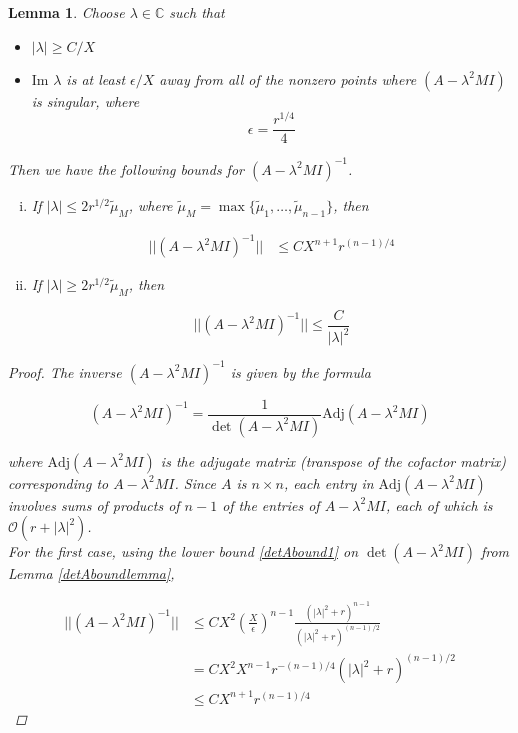 \documentclass[12pt]{article}
\def\C{{\mathbb C}}
\newtheorem{lemma}{Lemma}
\begin{document}
\begin{lemma}\label{Ainvboundlemma}
Choose $\lambda \in \C$ such that
\begin{itemize}
	\item $|\lambda| \geq C/X$
	\item $\text{Im }\lambda$ is at least $\epsilon/X$ away from all of the nonzero points where $(A - \lambda^2 MI)$ is singular, where
	\[
	\epsilon = \frac{r^{1/4}}{4}
	\]
\end{itemize}

Then we have the following bounds for $(A - \lambda^2 M I)^{-1}$.
\begin{enumerate}[(i)]
\item If $|\lambda| \leq 2 r^{1/2} \tilde{\mu}_M$, where $\tilde{\mu}_M = \max\{\tilde{\mu}_1, \dots, \tilde{\mu}_{n-1}\}$, then

\begin{align}\label{Ainvbound1}
||(A - \lambda^2 M I)^{-1}|| &\leq C X ^{n+1} r^{(n-1)/4}
\end{align}

\item If $|\lambda| \geq 2 r^{1/2} \tilde{\mu}_M$, then

\begin{equation}\label{Ainvbound2}
||(A - \lambda^2 M I)^{-1}|| \leq \frac{C}{|\lambda|^2}
\end{equation}

\end{enumerate}
\begin{proof}
The inverse $(A - \lambda^2 M I)^{-1}$ is given by the formula

\[
(A - \lambda^2 M I)^{-1} = \frac{1}{\det(A - \lambda^2 M I)}\text{Adj}(A - \lambda^2 M I)
\]

where $\text{Adj}(A - \lambda^2 M I)$ is the adjugate matrix (transpose of the cofactor matrix) corresponding to $A - \lambda^2 M I$. Since $A$ is $n \times n$, each entry in $\text{Adj}(A - \lambda^2 M I)$ involves sums of products of $n-1$ of the entries of $A - \lambda^2 M I$, each of which is $\mathcal{O}(r + |\lambda|^2)$. \\

For the first case, using the lower bound \eqref{detAbound1} on $\det(A - \lambda^2 M I)$ from Lemma \ref{detAboundlemma}, 

\begin{align*}
||(A - \lambda^2 M I)^{-1}|| &\leq C X^2 \left(\frac{X}{\epsilon}\right)^{n-1} 
\frac{\left( |\lambda|^2 + r \right)^{n-1}}{\left( |\lambda|^2 + r \right)^{(n-1)/2}} \\
&= C X^2 X^{n - 1} r^{-(n-1)/4}\left( |\lambda|^2 + r \right)^{(n-1)/2} \\
&\leq C X ^{n+1} r^{(n-1)/4}
\end{align*}


\end{proof}
\end{lemma}
\end{document}
